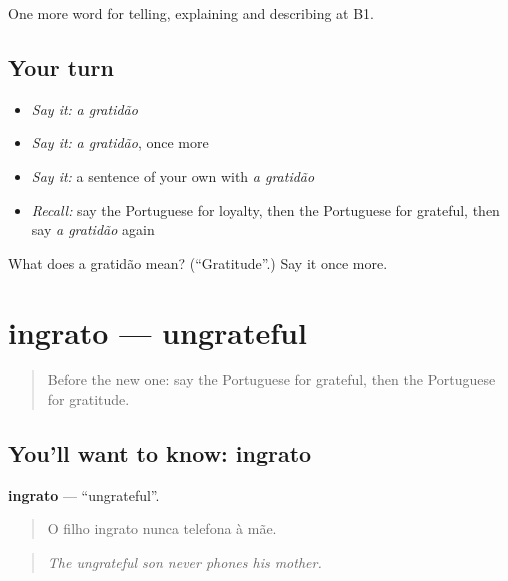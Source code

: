 \begin{grammarlens}[title={What you've built}]
One more word for telling, explaining and describing at B1.
\end{grammarlens}

\subsection*{Your turn}
\begin{itemize}
\raggedright
  \item \emph{Say it:} \emph{a gratidão}
  \item \emph{Say it:} \emph{a gratidão}, once more
  \item \emph{Say it:} a sentence of your own with \emph{a gratidão}
  \item \emph{Recall:} say the Portuguese for loyalty, then the Portuguese for grateful, then say \emph{a gratidão} again
\end{itemize}

\begin{tcolorbox}[breakable,colback=teal!4,colframe=teal!35!black,title={Before you move on}]
What does a gratidão mean? (\textquotedblleft{}Gratitude\textquotedblright{}.) Say it once more.
\end{tcolorbox}
\section[ingrato]{ingrato — ungrateful}

\label{lesson:PT-C499-ingrato}



\begin{quote}
Before the new one: say the Portuguese for grateful, then the Portuguese for gratitude.
\end{quote}

\subsection*{You'll want to know: ingrato}
\textbf{ingrato} — \textquotedblleft{}ungrateful\textquotedblright{}.

\begin{quote}
O filho ingrato nunca telefona à mãe.
\end{quote}

\begin{quote}
\emph{The ungrateful son never phones his mother.}
\end{quote}

